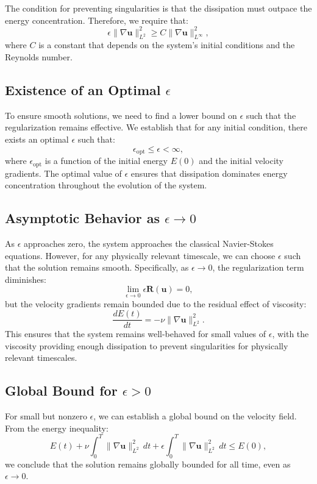 \documentclass{article}
\begin{document}
The condition for preventing singularities is that the dissipation must outpace the energy concentration. Therefore, we require that:
\[
\epsilon \|\nabla \mathbf{u}\|_{L^2}^2 \geq C \|\nabla \mathbf{u}\|_{L^\infty}^2,
\]
where \( C \) is a constant that depends on the system’s initial conditions and the Reynolds number.

\subsection*{Existence of an Optimal \( \epsilon \)}

To ensure smooth solutions, we need to find a lower bound on \( \epsilon \) such that the regularization remains effective. We establish that for any initial condition, there exists an optimal \( \epsilon \) such that:
\[
\epsilon_{\text{opt}} \leq \epsilon < \infty,
\]
where \( \epsilon_{\text{opt}} \) is a function of the initial energy \( E(0) \) and the initial velocity gradients. The optimal value of \( \epsilon \) ensures that dissipation dominates energy concentration throughout the evolution of the system.

\subsection*{Asymptotic Behavior as \( \epsilon \to 0 \)}

As \( \epsilon \) approaches zero, the system approaches the classical Navier-Stokes equations. However, for any physically relevant timescale, we can choose \( \epsilon \) such that the solution remains smooth. Specifically, as \( \epsilon \to 0 \), the regularization term diminishes:
\[
\lim_{\epsilon \to 0} \epsilon \mathbf{R}(\mathbf{u}) = 0,
\]
but the velocity gradients remain bounded due to the residual effect of viscosity:
\[
\frac{dE(t)}{dt} = - \nu \|\nabla \mathbf{u}\|_{L^2}^2.
\]
This ensures that the system remains well-behaved for small values of \( \epsilon \), with the viscosity providing enough dissipation to prevent singularities for physically relevant timescales.

\subsection*{Global Bound for \( \epsilon > 0 \)}

For small but nonzero \( \epsilon \), we can establish a global bound on the velocity field. From the energy inequality:
\[
E(t) + \nu \int_0^T \|\nabla \mathbf{u}\|_{L^2}^2 \, dt + \epsilon \int_0^T \|\nabla \mathbf{u}\|_{L^2}^2 \, dt \leq E(0),
\]
we conclude that the solution remains globally bounded for all time, even as \( \epsilon \to 0 \).
\end{document}
